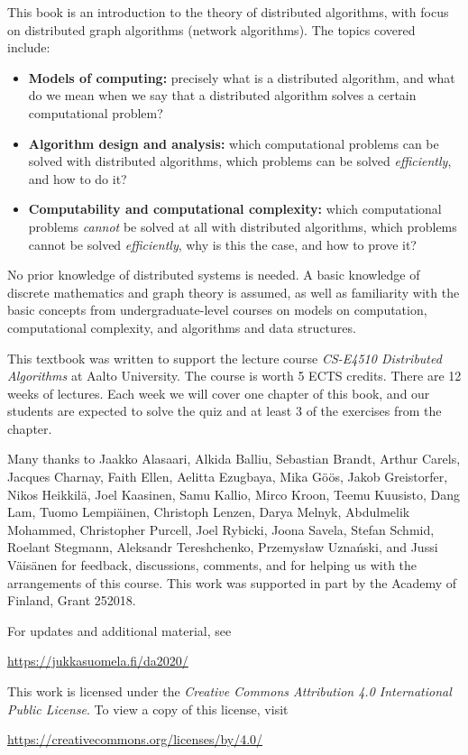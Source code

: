 
This book is an introduction to the theory of distributed algorithms, with focus on distributed graph algorithms (network algorithms). The topics covered include:
\begin{itemize}
    \item \textbf{Models of computing:} precisely what is a distributed algorithm, and what do we mean when we say that a distributed algorithm solves a certain computational problem?
    \item \textbf{Algorithm design and analysis:} which computational problems can be solved with distributed algorithms, which problems can be solved \emph{efficiently}, and how to do it?
    \item \textbf{Computability and computational complexity:} which computational problems \emph{cannot} be solved at all with distributed algorithms, which problems cannot be solved \emph{efficiently}, why is this the case, and how to prove it?
\end{itemize}
No prior knowledge of distributed systems is needed. A basic knowledge of discrete mathematics and graph theory is assumed, as well as familiarity with the basic concepts from undergraduate-level courses on models on computation, computational complexity, and algorithms and data structures.



This textbook was written to support the lecture course \emph{CS-E4510 Distributed Algorithms} at Aalto University. The course is worth 5 ECTS credits. There are 12 weeks of lectures. Each week we will cover one chapter of this book, and our students are expected to solve the quiz and at least 3 of the exercises from the chapter.



Many thanks to
Jaakko Alasaari,
Alkida Balliu,
Sebastian Brandt,
Arthur Carels,
Jacques Charnay,
Faith Ellen,
Aelitta Ezugbaya,
Mika G\"o\"os,
Jakob Greistorfer,
Nikos Heikkil\"a,
Joel Kaasinen,
Samu Kallio,
Mirco Kroon,
Tee\-mu Kuu\-sisto,
Dang Lam,
Tuo\-mo Lem\-pi\"a\-inen,
Christoph Lenzen,
Darya Melnyk,
Abdulmelik Mohammed,
Christopher Purcell,
Joel Rybicki,
Joona Savela,
Stefan Schmid,
Roelant Stegmann,
Aleksandr Tereshchenko,
Przemys\l{}aw Uzna\'nski,
and
Jussi V\"ai\-s\"a\-nen
for feedback, discussions, comments, and for helping us with the arrangements of this course. This work was supported in part by the Academy of Finland, Grant 252018.



For updates and additional material, see
\begin{center}
    \url{https://jukkasuomela.fi/da2020/}
\end{center}



\begin{samepage}
This work is licensed under the \emph{Creative Commons Attribution 4.0 International Public License}. To view a copy of this license, visit
\begin{center}
    \url{https://creativecommons.org/licenses/by/4.0/}
\end{center}
\end{samepage}
